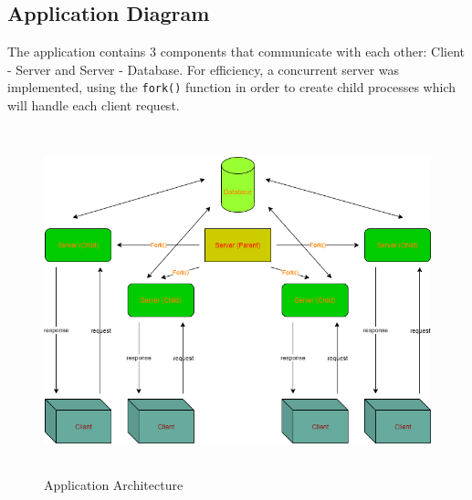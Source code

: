 \documentclass[runningheads, a4paper]{llncs}
\begin{document}
\subsection{Application Diagram}
The application contains 3 components that communicate with each other: Client - Server and Server - Database. For efficiency, a concurrent server was implemented, using the \texttt{fork()} function in order to create child processes which will handle each client request.
\newpage
\begin{figure}[h!]
    \centering
    \includegraphics[width=13cm, height=10cm, keepaspectratio]{Archt.png}
    \caption{Application Architecture}
    \label{funct:diagram}
\end{figure}
\end{document}
